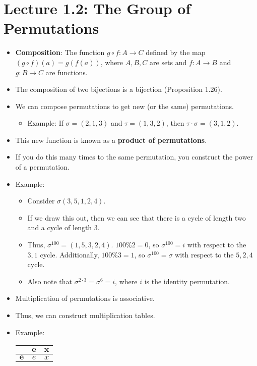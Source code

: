 \documentclass[../main.tex]{subfiles}
\begin{document}
\section{Lecture 1.2: The Group of Permutations}
\begin{itemize}
    \item \textbf{Composition}: The function $g\circ f:A\to C$ defined by the map $(g\circ f)(a)=g(f(a))$, where $A,B,C$ are sets and $f:A\to B$ and $g:B\to C$ are functions.
    \item The composition of two bijections is a bijection (Proposition 1.26).
    \item We can compose permutations to get new (or the same) permutations.
    \begin{itemize}
        \item Example: If $\sigma=(2,1,3)$ and $\tau=(1,3,2)$, then $\tau\cdot\sigma=(3,1,2)$.
    \end{itemize}
    \item This new function is known as a \textbf{product of permutations}.
    \item If you do this many times to the same permutation, you construct the power of a permutation.
    \item Example:
    \begin{itemize}
        \item Consider $\sigma(3,5,1,2,4)$.
        \item If we draw this out, then we can see that there is a cycle of length two and a cycle of length 3.
        \item Thus, $\sigma^{100}=(1,5,3,2,4)$. $100\%2=0$, so $\sigma^{100}=i$ with respect to the $3,1$ cycle. Additionally, $100\%3=1$, so $\sigma^{100}=\sigma$ with respect to the $5,2,4$ cycle.
        \item Also note that $\sigma^{2\cdot 3}=\sigma^6=i$, where $i$ is the identity permutation.
    \end{itemize}
    \item Multiplication of permutations is associative.
    \item Thus, we can construct multiplication tables.
    \item Example:
    \begin{table}[h!]
        \centering
        \renewcommand{\arraystretch}{1.2}
        \begin{tabular}{c|cc}
                     & $\bm{e}$ & $\bm{x}$\\
            \hline
            $\bm{e}$ & $e$      & $x$\\

\end{tabular}
\end{table}
\end{itemize}
\end{document}
